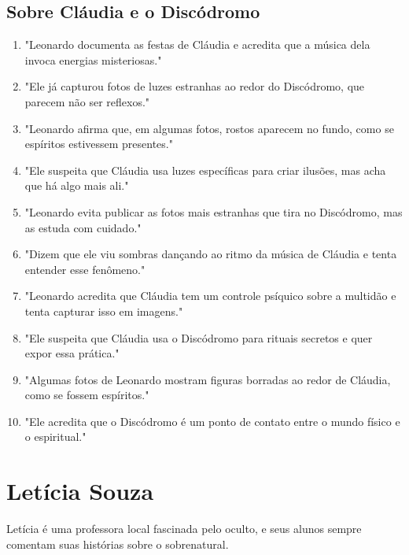\subsection*{Sobre Cláudia e o Discódromo}
\begin{enumerate}
    \item "Leonardo documenta as festas de Cláudia e acredita que a música dela invoca energias misteriosas."
    \item "Ele já capturou fotos de luzes estranhas ao redor do Discódromo, que parecem não ser reflexos."
    \item "Leonardo afirma que, em algumas fotos, rostos aparecem no fundo, como se espíritos estivessem presentes."
    \item "Ele suspeita que Cláudia usa luzes específicas para criar ilusões, mas acha que há algo mais ali."
    \item "Leonardo evita publicar as fotos mais estranhas que tira no Discódromo, mas as estuda com cuidado."
    \item "Dizem que ele viu sombras dançando ao ritmo da música de Cláudia e tenta entender esse fenômeno."
    \item "Leonardo acredita que Cláudia tem um controle psíquico sobre a multidão e tenta capturar isso em imagens."
    \item "Ele suspeita que Cláudia usa o Discódromo para rituais secretos e quer expor essa prática."
    \item "Algumas fotos de Leonardo mostram figuras borradas ao redor de Cláudia, como se fossem espíritos."
    \item "Ele acredita que o Discódromo é um ponto de contato entre o mundo físico e o espiritual."
\end{enumerate}

\section{Letícia Souza}
Letícia é uma professora local fascinada pelo oculto, e seus alunos sempre comentam suas histórias sobre o sobrenatural.

